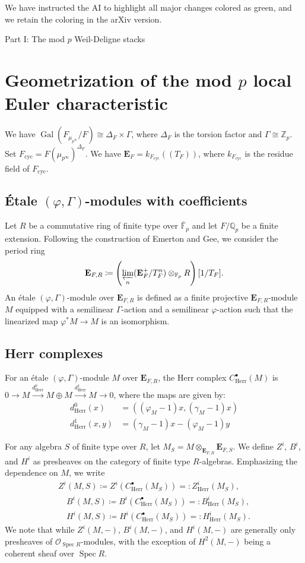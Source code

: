 \documentclass[11pt]{amsart}
\theoremstyle{definition}
\newcommand{\Z}{\mathbb{Z}}
\newcommand{\Q}{\mathbb{Q}}
\newcommand{\bfE}{\mathbf{E}}
\newcommand{\bFp}{\bar{\mathbb{F}}_p}
\newcommand{\Fp}{\mathbb{F}_p}
\newcommand{\cO}{\mathcal{O}}
\newcommand{\cyc}{{\operatorname{cyc}}}
\DeclareMathOperator{\Spec}{Spec}
\DeclareMathOperator{\Gal}{Gal}
\newcommand{\Herr}{\mathrm{Herr}}
\begin{document}
We have instructed the AI to highlight all major changes colored as green,
and we retain the coloring in the arXiv version.

\newpage
{}
{}

\noindent
{\large Part I: The mod $p$ Weil-Deligne stacks}


\section{Geometrization of the mod $p$ local Euler characteristic}

We have $\Gal(F_{\mu_{p^\infty}}/F)\cong \Delta_F
\times \Gamma$, where $\Delta_F$ is the torsion factor
and $\Gamma\cong \Z_p$.
Set $F_{\cyc} = F(\mu_{p^\infty})^{\Delta_F}$.
We have
$\mathbf{E}_F = k_{F_{\cyc}}(\!(T_F)\!)$,
where $k_{F_{\cyc}}$ is the residue field of $F_{\cyc}$.

\subsection{\'Etale $(\varphi, \Gamma)$-modules with coefficients}
Let $R$ be a commutative ring of finite type over $\bFp$
and let $F/\Q_p$ be a finite extension. Following the construction of Emerton and Gee, we consider the period ring 
\[ \bfE_{F,R} \coloneqq \left( \varprojlim_n (\bfE_F^+/T_F^n) \otimes_{\Fp} R \right) [1/T_F]. \]
An \'etale $(\varphi, \Gamma)$-module over $\bfE_{F,R}$ is defined as a finite projective $\bfE_{F,R}$-module $M$ equipped with a semilinear $\Gamma$-action and a semilinear $\varphi$-action such that the linearized map $\varphi^* M \to M$ is an isomorphism.


\subsection{Herr complexes}
For an \'etale $(\varphi, \Gamma)$-module $M$ over $\bfE_{F,R}$, the Herr complex ${C}_{\Herr}^\bullet(M)$
is $0 \to M \xrightarrow{d^0_\Herr} M \oplus M \xrightarrow{d^1_\Herr} M \to 0$, where the maps are given by:
\begin{align*}
d^0_\Herr(x) &= ((\varphi_M-1)x, (\gamma_M-1)x) \\
d^1_\Herr(x, y) &= (\gamma_M-1)x - (\varphi_M-1)y
\end{align*}


For any algebra $S$ of finite type over $R$, let 
$M_{S} = M \otimes_{\bfE_{F,R}} \bfE_{F,S}$. We define $Z^i$, $B^i$, and $H^i$ as presheaves on the category of finite type $R$-algebras. Emphasizing the dependence on $M$, we write
\begin{align*}
Z^i(M, S) \coloneqq Z^i({C}_{\Herr}^\bullet(M_S))
=:Z^i_{\Herr}(M_S),
\\
\quad B^i(M, S) \coloneqq B^i({C}_{\Herr}^\bullet(M_S))
=:B^i_{\Herr}(M_S),
\\
\quad H^i(M, S) \coloneqq H^i({C}_{\Herr}^\bullet(M_S))
=:H^i_{\Herr}(M_S).
\end{align*}
We note that while $Z^i(M,-)$, $B^i(M,-)$, and $H^i(M,-)$ are generally only 
presheaves of $\cO_{\Spec R}$-modules, with the exception of $H^2(M, -)$ being a coherent sheaf over $\Spec R$.
\end{document}
